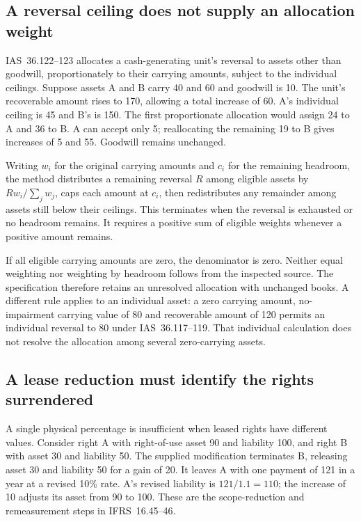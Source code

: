 \subsection{A reversal ceiling does not supply an allocation weight}

IAS~36.122--123 allocates a cash-generating unit's reversal to assets other than
goodwill, proportionately to their carrying amounts, subject to the individual
ceilings. Suppose assets A and B carry 40 and 60 and goodwill is 10. The unit's
recoverable amount rises to 170, allowing a total increase of 60. A's individual
ceiling is 45 and B's is 150. The first proportionate allocation would assign
24 to A and 36 to B. A can accept only 5; reallocating the remaining 19 to B
gives increases of 5 and 55. Goodwill remains unchanged.

Writing \(w_i\) for the original carrying amounts and \(c_i\) for the remaining
headroom, the method distributes a remaining reversal \(R\) among eligible
assets by \(Rw_i/\sum_j w_j\), caps each amount at \(c_i\), then redistributes
any remainder among assets still below their ceilings. This terminates when the
reversal is exhausted or no headroom remains. It requires a positive sum of
eligible weights whenever a positive amount remains.

If all eligible carrying amounts are zero, the denominator is zero. Neither
equal weighting nor weighting by headroom follows from the inspected source.
The specification therefore retains an unresolved allocation with unchanged
books. A different rule applies to an individual asset: a zero carrying amount,
no-impairment carrying value of 80 and recoverable amount of 120 permits an
individual reversal to 80 under IAS~36.117--119. That individual calculation
does not resolve the allocation among several zero-carrying assets.

\subsection{A lease reduction must identify the rights surrendered}

A single physical percentage is insufficient when leased rights have different
values. Consider right A with right-of-use asset 90 and liability 100, and right
B with asset 30 and liability 50. The supplied modification terminates B,
releasing asset 30 and liability 50 for a gain of 20. It leaves A with one
payment of 121 in a year at a revised 10\% rate. A's revised liability is
\(121/1.1=110\); the increase of 10 adjusts its asset from 90 to 100.
These are the scope-reduction and remeasurement steps in IFRS~16.45--46.

